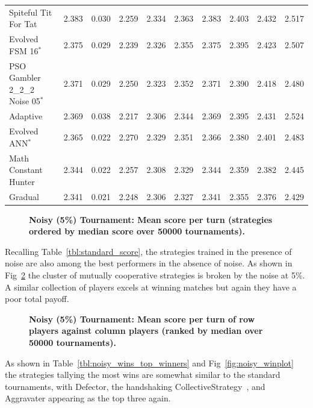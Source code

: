 \documentclass[10pt,letterpaper]{article}
\begin{document}
\begin{table}[!hbtp]
\begin{tabular}{lrrrrrrrrr}
        Spiteful Tit For Tat             &  2.383 &  0.030 &  2.259 &  2.334 &  2.363 &  2.383 &  2.403 &  2.432 &  2.517 \\
        Evolved FSM 16$^{*}$             &  2.375 &  0.029 &  2.239 &  2.326 &  2.355 &  2.375 &  2.395 &  2.423 &  2.507 \\
        PSO Gambler 2\_2\_2 Noise 05$^{*}$ &  2.371 &  0.029 &  2.250 &  2.323 &  2.352 &  2.371 &  2.390 &  2.418 &  2.480 \\
        Adaptive                         &  2.369 &  0.038 &  2.217 &  2.306 &  2.344 &  2.369 &  2.395 &  2.431 &  2.524 \\
        Evolved ANN$^{*}$                &  2.365 &  0.022 &  2.270 &  2.329 &  2.351 &  2.366 &  2.380 &  2.401 &  2.483 \\
        Math Constant Hunter             &  2.344 &  0.022 &  2.257 &  2.308 &  2.329 &  2.344 &  2.359 &  2.382 &  2.445 \\
        Gradual                          &  2.341 &  0.021 &  2.248 &  2.306 &  2.327 &  2.341 &  2.355 &  2.376 &  2.429 \\
        \bottomrule
        \end{tabular}
        \label{tbl:noisy_score}
\end{table}


\begin{figure}[!hbtp]
    \centering
    \caption{\bf Noisy (5\%) Tournament: Mean score per turn
        (strategies ordered by median score over 50000 tournaments).}
    \label{fig:noisy_score}
\end{figure}

Recalling Table~\ref{tbl:standard_score}, the strategies trained in the presence
of noise are also among the best performers in the absence of noise. As shown in
Fig~\ref{fig:noisy_heatmap} the cluster of mutually cooperative strategies is
broken by the noise at 5\%. A similar collection of players excels at winning
matches but again they have a poor total payoff.

\begin{figure}[!hbtp]
    \centering
    \caption{\bf Noisy (5\%) Tournament: Mean score per turn of row players against
    column players (ranked by median over
        50000 tournaments).}
    \label{fig:noisy_heatmap}
\end{figure}

As shown in Table~\ref{tbl:noisy_wins_top_winners} and
Fig~\ref{fig:noisy_winplot} the strategies tallying the most wins are
somewhat similar to the standard tournaments, with Defector, the handshaking
CollectiveStrategy~\cite{Li2009}, and Aggravater appearing as the top three again.
\end{document}
